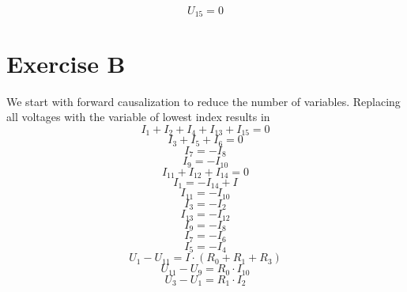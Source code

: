 \documentclass[10pt,a4paper]{article}
\begin{document}
\begin{equation*}
  U_{15} = 0
\end{equation*}

\section*{Exercise B}

We start with forward causalization to reduce the number of variables.
Replacing all voltages with the variable of lowest index results in
\begin{equation*}
  I_{1} + I_{2} + I_{4} + I_{13} + I_{15} = 0
\end{equation*}
\begin{equation*}
  I_{3} + I_{5} + I_{6} = 0
\end{equation*}
\begin{equation*}
  I_{7} = -I_{8}
\end{equation*}
\begin{equation*}
  I_{9} = -I_{10}
\end{equation*}
\begin{equation*}
  I_{11} + I_{12} + I_{14} = 0
\end{equation*}
\begin{equation*}
  I_{1} = -I_{14} + I
\end{equation*}
\begin{equation*}
  I_{11} = -I_{10}
\end{equation*}
\begin{equation*}
  I_{3} = -I_{2}
\end{equation*}
\begin{equation*}
  I_{13} = -I_{12}
\end{equation*}
\begin{equation*}
  I_{9} = -I_{8}
\end{equation*}
\begin{equation*}
  I_{7} = -I_{6}
\end{equation*}
\begin{equation*}
  I_{5} = -I_{4}
\end{equation*}
\begin{equation*}
  U_{1} - U_{11} = I \cdot (R_{0} + R_{1} + R_{3})
\end{equation*}
\begin{equation*}
  U_{11} - U_{9} = R_{0} \cdot I_{10}
\end{equation*}
\begin{equation*}
  U_{3} - U_{1} = R_{1} \cdot I_{2}
\end{equation*}
\end{document}
